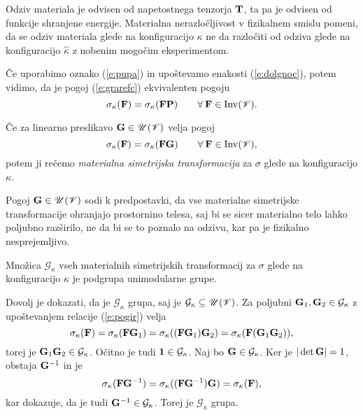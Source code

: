 Odziv materiala je odvisen od napetostnega tenzorja $\mathbf T$, ta pa je odvisen
od funkcije shranjene energije.
Materialna nerazločljivost v fizikalnem smislu pomeni, da se odziv materiala
glede na konfiguracijo $\kappa$ ne da razločiti od odziva glede na konfiguracijo
$\widehat{\kappa}$ z nobenim mogočim eksperimentom.

Če uporabimo oznako (\ref{e:pupa}) in upoštevamo enakosti (\ref{e:dolgnoc}),
potem vidimo, da je pogoj (\ref{e:grarefc}) ekvivalenten pogoju
\begin{equation*}
	\sigma_{\kappa}(\mathbf F)=\sigma_{\kappa}(\mathbf F\mathbf P)\qquad
	\forall\:\mathbf F\in\mathrm{Inv}(\mathscr V).
\end{equation*}

\begin{definicija}
	Če za linearno preslikavo $\mathbf G\in\mathscr{U}(\mathscr V)$ velja pogoj
	\begin{equation} \label{e:pogir}
		\sigma_{\kappa}(\mathbf F)=\sigma_{\kappa}(\mathbf F\mathbf G)\qquad
		\forall\:\mathbf F\in\mathrm{Inv}(\mathscr V),
	\end{equation}
	potem ji rečemo \emph{materialna simetrijska transformacija} za $\sigma$ glede na konfiguracijo $\kappa$.
\end{definicija}

Pogoj $\mathbf G\in\mathscr{U}(\mathscr V)$ sodi k predpostavki,
da vse materialne simetrijske transformacije ohranjajo prostornino telesa,
saj bi se sicer materialno telo lahko poljubno razši\-rilo, ne da bi se to poznalo na odzivu,
kar pa je fizikalno nesprejemljivo.

\begin{izrek}
	Množica $\mathcal{G}_{\kappa}$ vseh materialnih simetrijskih transformacij za $\sigma$ glede
	na konfiguracijo $\kappa$ je podgrupa unimodularne grupe.
\end{izrek}

\proof
	Dovolj je dokazati, da je $\mathcal{G}_{\kappa}$ grupa, saj je $\mathcal{G}_{\kappa}\subseteq\mathscr{U}(\mathscr V)$.
	Za poljubni $\mathbf G_1,\mathbf G_2\in\mathcal{G}_{\kappa}$
	z upoštevanjem relacije (\ref{e:pogir}) velja
	\[
		\sigma_{\kappa}(\mathbf F)=\sigma_{\kappa}(\mathbf F\mathbf G_1)
		=\sigma_{\kappa}((\mathbf F\mathbf G_1)\mathbf G_2)=\sigma_{\kappa}(\mathbf F(\mathbf G_1\mathbf G_2)),
	\]
	torej je $\mathbf G_1\mathbf G_2\in\mathcal{G}_{\kappa}$. Očitno je tudi $\mathbf 1\in\mathcal{G}_{\kappa}$.
	Naj bo $\mathbf G\in\mathcal{G}_{\kappa}$. Ker je $|\det\mathbf G|=1$, obstaja $\mathbf G^{-1}$ in je
	\[
		\sigma_{\kappa}(\mathbf F\mathbf G^{-1})=\sigma_{\kappa}((\mathbf F\mathbf G^{-1})\mathbf G)
		=\sigma_{\kappa}(\mathbf F),
	\]
	kar dokazuje, da je tudi $\mathbf G^{-1}\in\mathcal{G}_{\kappa}$. Torej je $\mathcal{G}_{\kappa}$ grupa.
\endproof

